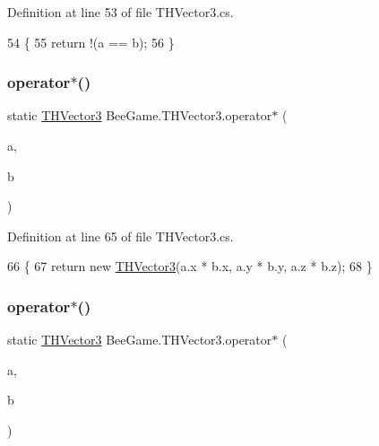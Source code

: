 Definition at line 53 of file T\+H\+Vector3.\+cs.


\begin{DoxyCode}
54         \{
55             \textcolor{keywordflow}{return} !(a == b);
56         \}
\end{DoxyCode}
\mbox{\label{struct_bee_game_1_1_t_h_vector3_a12e036f0743ac6ad26ac3b5c936c2b99}} 
\subsubsection{\texorpdfstring{operator$\ast$()}{operator*()}\hspace{0.1cm}{\footnotesize\ttfamily [1/2]}}
{\footnotesize\ttfamily static \hyperlink{struct_bee_game_1_1_t_h_vector3}{T\+H\+Vector3} Bee\+Game.\+T\+H\+Vector3.\+operator$\ast$ (\begin{DoxyParamCaption}\item[{\hyperlink{struct_bee_game_1_1_t_h_vector3}{T\+H\+Vector3}}]{a,  }\item[{\hyperlink{struct_bee_game_1_1_t_h_vector3}{T\+H\+Vector3}}]{b }\end{DoxyParamCaption})\hspace{0.3cm}{\ttfamily [static]}}



Definition at line 65 of file T\+H\+Vector3.\+cs.


\begin{DoxyCode}
66         \{
67             \textcolor{keywordflow}{return} \textcolor{keyword}{new} \hyperlink{struct_bee_game_1_1_t_h_vector3_ad1b3467b019ea95fc114536aab566fb4}{THVector3}(a.x * b.x, a.y * b.y, a.z * b.z);
68         \}
\end{DoxyCode}
\mbox{\label{struct_bee_game_1_1_t_h_vector3_a62b6cab97890f7bb66c69c6f60bab04f}} 
\subsubsection{\texorpdfstring{operator$\ast$()}{operator*()}\hspace{0.1cm}{\footnotesize\ttfamily [2/2]}}
{\footnotesize\ttfamily static \hyperlink{struct_bee_game_1_1_t_h_vector3}{T\+H\+Vector3} Bee\+Game.\+T\+H\+Vector3.\+operator$\ast$ (\begin{DoxyParamCaption}\item[{\hyperlink{struct_bee_game_1_1_t_h_vector3}{T\+H\+Vector3}}]{a,  }\item[{float}]{b }\end{DoxyParamCaption})\hspace{0.3cm}{\ttfamily [static]}}



